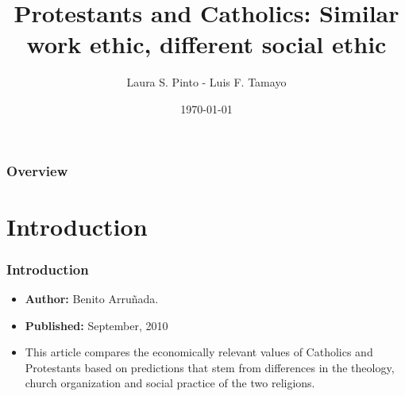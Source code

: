 \documentclass[pdftex,12pt,xcolor=pdftex,table]{beamer}
\title[Economic Growth]{Protestants and Catholics: Similar work ethic, different social ethic}
\author{Laura S. Pinto - Luis F. Tamayo }
\institute[PUJ] 
{
Pontificia Universidad Javeriana \\ 
\medskip
}
\date{\today}
\begin{document}
\begin{frame}
\titlepage 
\end{frame}
\begin{frame}
\frametitle{Overview} 
\tableofcontents 
\end{frame}
\section{Introduction} 
\begin{frame}
\frametitle{Introduction}
\begin{itemize}
\item \textbf{Author:} Benito Arruñada.
\item \textbf{Published:} September, 2010
\item This article compares the economically relevant values of Catholics and Protestants based on
predictions that stem from differences in the theology, church organization and social practice of
the two religions. 
\end{itemize}
\end{frame}
\end{document}
